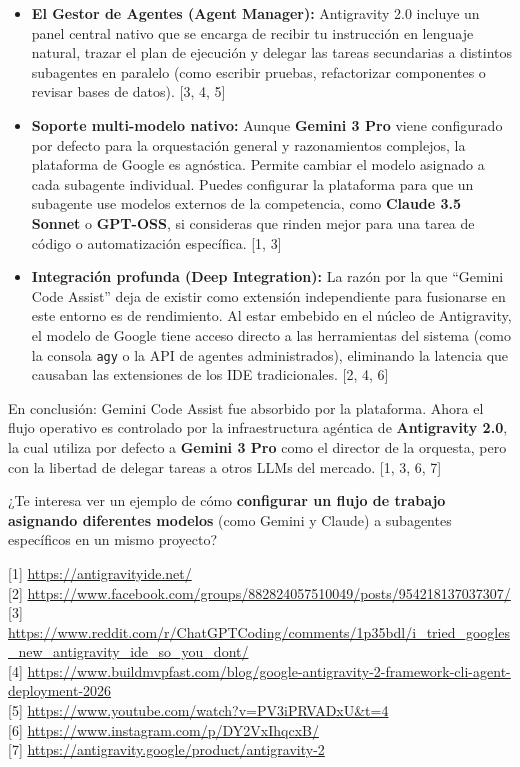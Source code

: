 \documentclass[12pt, a4paper]{article}
\begin{document}
\begin{itemize}
    \item \textbf{El Gestor de Agentes (Agent Manager):} Antigravity 2.0 incluye un panel central nativo que se encarga de recibir tu instrucción en lenguaje natural, trazar el plan de ejecución y delegar las tareas secundarias a distintos subagentes en paralelo (como escribir pruebas, refactorizar componentes o revisar bases de datos). [3, 4, 5]
    \item \textbf{Soporte multi-modelo nativo:} Aunque \textbf{Gemini 3 Pro} viene configurado por defecto para la orquestación general y razonamientos complejos, la plataforma de Google es agnóstica. Permite cambiar el modelo asignado a cada subagente individual. Puedes configurar la plataforma para que un subagente use modelos externos de la competencia, como \textbf{Claude 3.5 Sonnet} o \textbf{GPT-OSS}, si consideras que rinden mejor para una tarea de código o automatización específica. [1, 3]
    \item \textbf{Integración profunda (Deep Integration):} La razón por la que ``Gemini Code Assist'' deja de existir como extensión independiente para fusionarse en este entorno es de rendimiento. Al estar embebido en el núcleo de Antigravity, el modelo de Google tiene acceso directo a las herramientas del sistema (como la consola \texttt{agy} o la API de agentes administrados), eliminando la latencia que causaban las extensiones de los IDE tradicionales. [2, 4, 6]
\end{itemize}

En conclusión: Gemini Code Assist fue absorbido por la plataforma. Ahora el flujo operativo es controlado por la infraestructura agéntica de \textbf{Antigravity 2.0}, la cual utiliza por defecto a \textbf{Gemini 3 Pro} como el director de la orquesta, pero con la libertad de delegar tareas a otros LLMs del mercado. [1, 3, 6, 7]

¿Te interesa ver un ejemplo de cómo \textbf{configurar un flujo de trabajo asignando diferentes modelos} (como Gemini y Claude) a subagentes específicos en un mismo proyecto?

[1] \url{https://antigravityide.net/} \\{}
[2] \url{https://www.facebook.com/groups/882824057510049/posts/954218137037307/} \\{}
[3] \url{https://www.reddit.com/r/ChatGPTCoding/comments/1p35bdl/i_tried_googles_new_antigravity_ide_so_you_dont/} \\{}
[4] \url{https://www.buildmvpfast.com/blog/google-antigravity-2-framework-cli-agent-deployment-2026} \\{}
[5] \url{https://www.youtube.com/watch?v=PV3iPRVADxU&t=4} \\{}
[6] \url{https://www.instagram.com/p/DY2VxIhqcxB/} \\{}
[7] \url{https://antigravity.google/product/antigravity-2}
\end{document}
